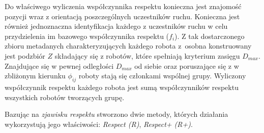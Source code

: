 \documentclass{beamer}
\begin{document}
\begin{frame}
{Do właściwego wyliczenia współczynnika respektu konieczna jest znajomość  pozycji wraz z orientacją poszczególnych uczestników ruchu. Konieczna jest również jednoznaczna identyfikacja każdego z uczestników ruchu w celu przydzielenia im bazowego współczynnika respektu ($f_i$). Z tak dostarczonego zbioru metadanych charakteryzujących każdego robota z~osobna konstruowany jest podzbiór $ Z $ składający się z robotów, które spełniają kryterium zasięgu $ D_{max} $. Znajdujące się w pewnej odległości $ D_{max} $ od siebie oraz poruszające się z w zbliżonym kierunku  $ \phi_{ij} $ roboty stają się członkami wspólnej grupy. Wyliczony współczynnik respektu każdego robota jest sumą współczynników respektu wszystkich robotów tworzących grupę.

Bazując na \textit{zjawisku respektu} stworzono dwie metody, których działania wykorzystują jego właściwości:  \textit{Respect (R)}, \textit{ Respect+ (R+)}.
}

\end{frame}	
\end{document}
